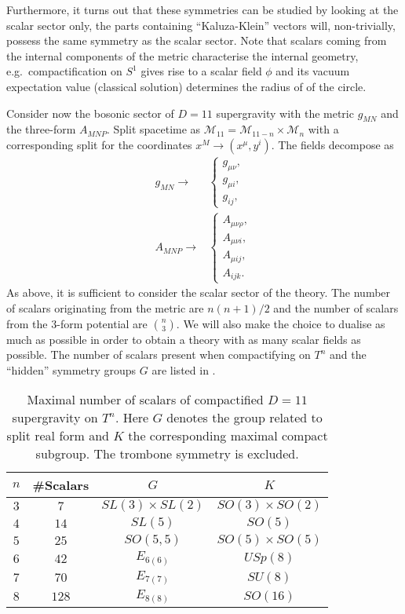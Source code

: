 Furthermore, it turns out that these symmetries can be studied by looking at the scalar sector only, the parts containing ``Kaluza-Klein'' vectors will, non-trivially, possess the same symmetry as the scalar sector. Note that scalars coming from the internal components of the metric characterise the internal geometry, e.g.\ compactification on $S^1$ gives rise to a scalar field $\phi$ and its vacuum expectation value (classical solution) determines the radius of of the circle. 

Consider now the bosonic sector of $D=11$ supergravity with the metric $g_{MN}$ and the three-form $A_{MNP}$. Split spacetime as $\mathcal{M}_{11}=\mathcal{M}_{11-n}\times\mathcal{M}_n$ with a corresponding split for the coordinates $x^M\to (x^\mu,y^i)$. The fields decompose as 
\begin{equation}
    \begin{aligned}
        g_{MN}\to &\begin{cases}g_{\mu\nu},\\g_{\mu i},\\g_{ij},\end{cases}\\
        A_{MNP}\to &\begin{cases}A_{\mu\nu\rho},\\A_{\mu\nu i},\\A_{\mu ij},\\A_{ijk}.\end{cases}
    \end{aligned}
\end{equation}
As above, it is sufficient to consider the scalar sector of the theory. The number of scalars originating from the metric are $n(n+1)/2$ and the number of scalars from the $3$-form potential are ${n}\choose{3}$. We will also make the choice to dualise as much as possible in order to obtain a theory with as many scalar fields as possible. The number of scalars present when compactifying on $T^n$ and the ``hidden'' symmetry groups $G$ are listed in .

\begin{table}[]
    \centering
    \caption{Maximal number of scalars of compactified $D=11$ supergravity on $T^n$. Here $G$ denotes the group related to split real form and $K$ the corresponding maximal compact subgroup. The trombone symmetry is excluded.}
    \label{tab:Scalar}
    \begin{tabular}{|c|c|c|c|}\hline
         $n$ & \#Scalars & $G$ & $K$ \\\hline
         $3$ & $7$ & $SL(3)\times SL(2)$ & $SO(3)\times SO(2)$\\\hline
         $4$ & $14$ & $SL(5)$ & $SO(5)$ \\\hline
         $5$ & $25$ & $SO(5,5)$ & $SO(5)\times SO(5)$ \\\hline
         $6$ & $42$ & $E_{6(6)}$ & $USp(8)$ \\\hline
         $7$ & $70$ & $E_{7(7)}$ & $SU(8)$ \\\hline
         $8$ & $128$ & $E_{8(8)}$ & $SO(16)$ \\\hline
    \end{tabular}
\end{table}

